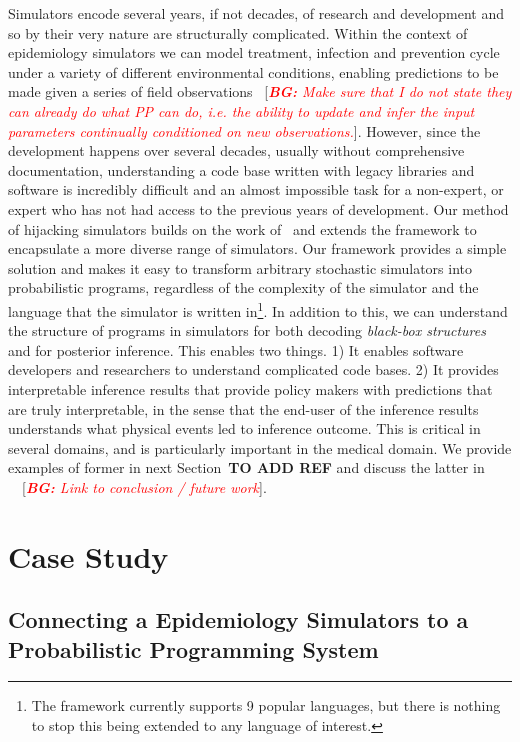 \documentclass{article}
\newcommand{\bg}[1]{~{{[{\it \textcolor{red}{{\bf BG:} #1}}]}}}
\begin{document}
Simulators encode several years, if not decades, of research and development and so by their very nature are structurally complicated. Within the context of epidemiology simulators we can model treatment, infection and prevention cycle under a variety of different environmental conditions, enabling predictions to be made given a series of field observations \bg{Make sure that I do not state they can already do what PP can do, i.e. the ability to update and infer the input parameters continually conditioned on new observations.}. However, since the development happens over several decades, usually without comprehensive documentation, understanding a code base written with legacy libraries and software is incredibly difficult and an almost impossible task for a non-expert, or expert who has not had access to the previous years of development. Our method of hijacking simulators builds on the work of~\cite{baydin2018efficient} and extends the framework to encapsulate a more diverse range of simulators. Our framework provides a simple solution and makes it easy to transform arbitrary stochastic simulators into probabilistic programs, regardless of the complexity of the simulator and the language that the simulator is written in\footnote{The framework currently supports 9 popular languages, but there is nothing to stop this being extended to any language of interest.}. In addition to this, we can understand the structure of programs in simulators for both decoding \emph{black-box structures} and for posterior inference. This enables two things. 1) It enables software developers and researchers to understand complicated code bases. 2) It provides interpretable inference results that provide policy makers with predictions that are truly interpretable, in the sense that the end-user of the inference results understands what physical events led to inference outcome. This is critical in several domains, and is particularly important in the medical domain. We provide examples of former in next Section~\textbf{TO ADD REF} and discuss the latter in ~\bg{Link to conclusion / future work}.


\section{Case Study}
\subsection{Connecting a Epidemiology Simulators to a Probabilistic Programming System}
\end{document}
